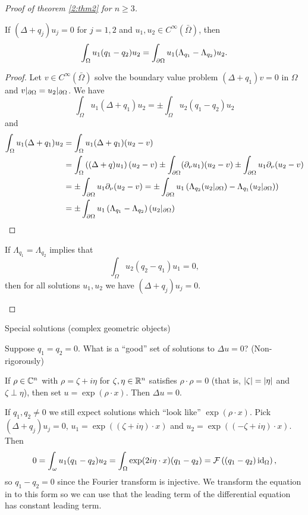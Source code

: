 \begin{proof}[Proof of theorem \ref{2:thm2} for $n \geq 3$]
  \begin{prop}
    If $(\Delta+q_j)u_j=0$ for $j=1,2$ and $u_1,u_2 \in C^\infty(\bar\Omega)$, then
    \[ \int_\Omega u_1(q_1-q_2)u_2 = \int_{\partial\Omega} u_1(\Lambda_{q_1}-\Lambda_{q_2})u_2. \]
  \end{prop}

  \begin{proof}
    Let $v \in C^\infty(\bar\Omega)$ solve the boundary value problem $(\Delta+q_1)v=0$ in $\Omega$ and $v|_{\partial\Omega}=u_2|_{\partial\Omega}$.
    We have
    \[ \int_\Omega u_1(\Delta+q_1)u_2 = \pm \int_\Omega u_2(q_1-q_2)u_2 \]
    and
    \begin{align*}
      \int_\Omega u_1(\Delta+q_1)u_2 &= \int_\Omega u_1(\Delta+q_1)(u_2-v) \\
      &= \int_\Omega \left( (\Delta+q)u_1 \right)(u_2-v) \pm \int_{\partial\Omega} (\partial_\nu u_1)(u_2-v) \pm \int_{\partial\Omega} u_1 \partial_\nu(u_2-v) \\
      &= \pm \int_{\partial\Omega} u_1 \partial_\nu (u_2-v) = \pm \int_{\partial\Omega} u_1\left( \Lambda_{q_2}(u_2|_{\partial\Omega}) - \Lambda_{q_1}(u_2|_{\partial\Omega}) \right) \\
      &= \pm \int_{\partial\Omega} u_1 \left( \Lambda_{q_1}-\Lambda_{q_2} \right)(u_2|_{\partial\Omega}) \qedhere
    \end{align*}
  \end{proof}

  \begin{cor}
    If $\Lambda_{q_1}=\Lambda_{q_2}$ implies that
    \[ \int_\Omega u_2(q_2-q_1)u_1=0, \]
    then for all solutions $u_1,u_2$ we have $(\Delta+q_j)u_j=0$.
  \end{cor}
\end{proof}

Special solutions (complex geometric objects)

Suppose $q_1=q_2=0$.
What is a ``good'' set of solutions to $\Delta u=0$?
(Non-rigorously)

If $\rho \in \mathbb{C}^n$ with $\rho=\zeta+i\eta$ for $\zeta,\eta \in \mathbb{R}^n$ satisfies $\rho \cdot \rho = 0$ (that is, $\left\lvert \zeta \right\rvert=\left\lvert \eta \right\rvert$ and $\zeta \perp \eta$), then set $u=\exp(\rho \cdot x)$.
Then $\Delta u=0$.

If $q_1,q_2 \neq 0$ we still expect solutions which ``look like'' $\exp(\rho \cdot x)$.
Pick $(\Delta+q_j)u_j=0$, $u_1=\exp\left( (\zeta+i\eta) \cdot x \right)$ and $u_2=\exp\left( (-\zeta+i\eta) \cdot x \right)$.
Then
\[ 0 = \int_\omega u_1(q_1-q_2)u_2 = \int_\Omega \exp(2i\eta \cdot x) (q_1-q_2) = \mathcal{F} \left( (q_1-q_2)\operatorname{id}_\Omega \right), \]
so $q_1-q_2=0$ since the Fourier transform is injective.
We transform the equation in to this form so we can use that the leading term of the differential equation has constant leading term.

